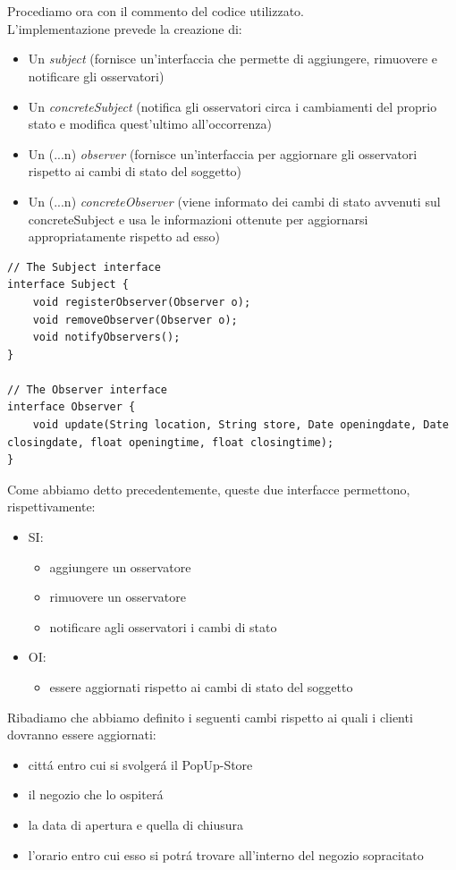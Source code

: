 \documentclass[12pt]{article}
\begin{document}
\\
\\
Procediamo ora con il commento del codice utilizzato. \\
L'implementazione prevede la creazione di:
\begin{itemize}
	\item Un \textit{subject} (fornisce un'interfaccia che permette di aggiungere, rimuovere e notificare gli osservatori)
	\item Un \textit{concreteSubject} (notifica gli osservatori circa i cambiamenti del proprio stato e modifica quest'ultimo all'occorrenza)
	\item Un (...n) \textit{observer} (fornisce un'interfaccia per aggiornare gli osservatori rispetto ai cambi di stato del soggetto)
	\item Un (...n) \textit{concreteObserver} (viene informato dei cambi di stato avvenuti sul concreteSubject e usa le informazioni ottenute per aggiornarsi appropriatamente rispetto ad esso)
\end{itemize}

\begin{lstlisting}
// The Subject interface 
interface Subject {
    void registerObserver(Observer o); 
    void removeObserver(Observer o); 
    void notifyObservers();
}

// The Observer interface 
interface Observer {
    void update(String location, String store, Date openingdate, Date closingdate, float openingtime, float closingtime); 
}
\end{lstlisting}

Come abbiamo detto precedentemente, queste due interfacce permettono, rispettivamente:
\begin{itemize}
	\item SI:
		\begin{itemize}
		\item aggiungere un osservatore 
		\item rimuovere un osservatore 
		\item notificare agli osservatori i cambi di stato
		\end{itemize}
	\item OI:
		\begin{itemize}
		\item essere aggiornati rispetto ai cambi di stato del soggetto
		\end{itemize}
\end{itemize}

Ribadiamo che abbiamo definito i seguenti cambi rispetto ai quali i clienti dovranno essere aggiornati:
\begin{itemize}
	\item citt\'a entro cui si svolger\'a il PopUp-Store 
	\item il negozio che lo ospiter\'a
	\item la data di apertura e quella di chiusura
	\item l'orario entro cui esso si potr\'a trovare all'interno del negozio sopracitato
\end{itemize}
\end{document}
